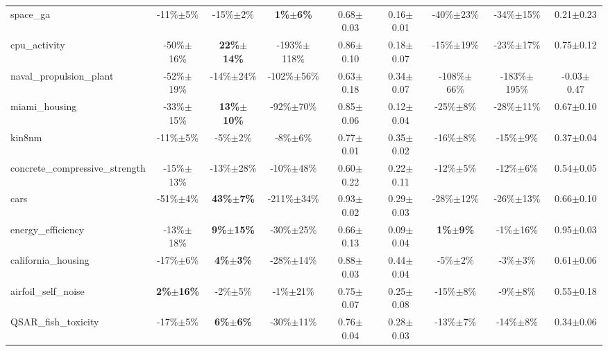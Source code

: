 \begin{table}[t]
\begin{small}
\begin{sc}
{\begin{tabular}{lcccccccc}
space\_ga  &  -11\%$\pm$5\%  &  -15\%$\pm$2\%  &  \textbf{1\%$\pm$6\%}  &  0.68$\pm$0.03  &  0.16$\pm$0.01  &  -40\%$\pm$23\%  &  -34\%$\pm$15\%  &  0.21$\pm$0.23 \\
cpu\_activity  &  -50\%$\pm$16\%  &  \textbf{22\%$\pm$14\%}  &  -193\%$\pm$118\%  &  0.86$\pm$0.10  &  0.18$\pm$0.07  &  -15\%$\pm$19\%  &  -23\%$\pm$17\%  &  0.75$\pm$0.12 \\
naval\_propulsion\_plant  &  -52\%$\pm$19\%  &  -14\%$\pm$24\%  &  -102\%$\pm$56\%  &  0.63$\pm$0.18  &  0.34$\pm$0.07  &  -108\%$\pm$66\%  &  -183\%$\pm$195\%  &  -0.03$\pm$0.47 \\
miami\_housing  &  -33\%$\pm$15\%  &  \textbf{13\%$\pm$10\%}  &  -92\%$\pm$70\%  &  0.85$\pm$0.06  &  0.12$\pm$0.04  &  -25\%$\pm$8\%  &  -28\%$\pm$11\%  &  0.67$\pm$0.10 \\
kin8nm  &  -11\%$\pm$5\%  &  -5\%$\pm$2\%  &  -8\%$\pm$6\%  &  0.77$\pm$0.01  &  0.35$\pm$0.02  &  -16\%$\pm$8\%  &  -15\%$\pm$9\%  &  0.37$\pm$0.04 \\
concrete\_compressive\_strength  &  -15\%$\pm$13\%  &  -13\%$\pm$28\%  &  -10\%$\pm$48\%  &  0.60$\pm$0.22  &  0.22$\pm$0.11  &  -12\%$\pm$5\%  &  -12\%$\pm$6\%  &  0.54$\pm$0.05 \\
cars  &  -51\%$\pm$4\%  &  \textbf{43\%$\pm$7\%}  &  -211\%$\pm$34\%  &  0.93$\pm$0.02  &  0.29$\pm$0.03  &  -28\%$\pm$12\%  &  -26\%$\pm$13\%  &  0.66$\pm$0.10 \\
energy\_efficiency  &  -13\%$\pm$18\%  &  \textbf{9\%$\pm$15\%}  &  -30\%$\pm$25\%  &  0.66$\pm$0.13  &  0.09$\pm$0.04  &  \textbf{1\%$\pm$9\%}  &  -1\%$\pm$16\%  &  0.95$\pm$0.03 \\
california\_housing  &  -17\%$\pm$6\%  &  \textbf{4\%$\pm$3\%}  &  -28\%$\pm$14\%  &  0.88$\pm$0.03  &  0.44$\pm$0.04  &  -5\%$\pm$2\%  &  -3\%$\pm$3\%  &  0.61$\pm$0.06 \\
airfoil\_self\_noise  &  \textbf{2\%$\pm$16\%}  &  -2\%$\pm$5\%  &  -1\%$\pm$21\%  &  0.75$\pm$0.07  &  0.25$\pm$0.08  &  -15\%$\pm$8\%  &  -9\%$\pm$8\%  &  0.55$\pm$0.18 \\
QSAR\_fish\_toxicity  &  -17\%$\pm$5\%  &  \textbf{6\%$\pm$6\%}  &  -30\%$\pm$11\%  &  0.76$\pm$0.04  &  0.28$\pm$0.03  &  -13\%$\pm$7\%  &  -14\%$\pm$8\%  &  0.34$\pm$0.06 \\

\bottomrule
\end{tabular}
}
\end{sc}
\end{small}
\end{table}
